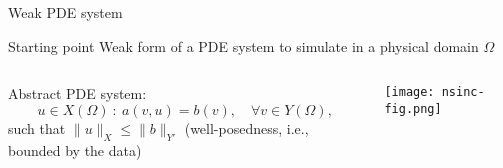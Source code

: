 \begin{frame}{Weak PDE system}
  \begin{block}{Starting point} {Weak form of a PDE} system to simulate in a physical domain $\Omega$
  \end{block}

  \vspace{1cm}



  \begin{columns}
    \begin{column}{0.65\textwidth}

      \begin{overprint}

%

Abstract PDE system:
$$
u \in X(\Omega) \ : \ a(v,u) = b(v), \quad \forall v \in Y(\Omega),
$$
such that $\| u \|_X \leq \| b \|_{Y'}$ (well-posedness, i.e., bounded by the data)

\vspace{0.1cm}


      \end{overprint}

    \end{column}
    \begin{column}{0.35\textwidth}

          \texttt{[image: nsinc-fig.png]}

    \end{column}

  \end{columns}

\end{frame}



